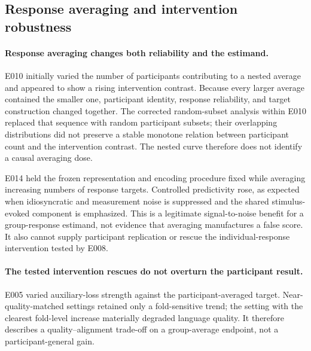 \subsection{Response averaging and intervention robustness}

\paragraph{Response averaging changes both reliability and the estimand.}
E010 initially varied the number of participants contributing to a nested average and appeared to show a rising intervention contrast.
Because every larger average contained the smaller one, participant identity, response reliability, and target construction changed together.
The corrected random-subset analysis within E010 replaced that sequence with random participant subsets; their overlapping distributions did not preserve a stable monotone relation between participant count and the intervention contrast.
The nested curve therefore does not identify a causal averaging dose. 

E014 held the frozen representation and encoding procedure fixed while averaging increasing numbers of response targets.
Controlled predictivity rose, as expected when idiosyncratic and measurement noise is suppressed and the shared stimulus-evoked component is emphasized.
This is a legitimate signal-to-noise benefit for a group-response estimand, not evidence that averaging manufactures a false score.
It also cannot supply participant replication or rescue the individual-response intervention tested by E008. 

\paragraph{The tested intervention rescues do not overturn the participant result.}
E005 varied auxiliary-loss strength against the participant-averaged target.
Near-quality-matched settings retained only a fold-sensitive trend; the setting with the clearest fold-level increase materially degraded language quality.
It therefore describes a quality--alignment trade-off on a group-average endpoint, not a participant-general gain. 


